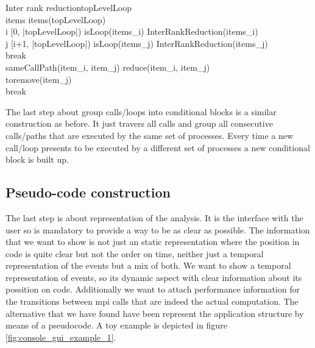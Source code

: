 \begin{pseudocode}{Inter rank reduction}{topLevelLoop}
\label{pc:inter_rank_reduction}
     \\
    items \GETS items(topLevelLoop) \\
    \FOR i \in [0, |topLevelLoop|) \DO
    \BEGIN
      \IF isLoop(items_{i}) \THEN
        InterRankReduction(items_{i}) \\
      \ELSE
      \BEGIN
        \FOR j \in [i+1, |topLevelLoop|) \DO
        \BEGIN
          \IF isLoop(items_{j}) \THEN
          \BEGIN
            InterRankReduction(items_{j}) \\
            break \\
          \END
          \ELSE
          \BEGIN
            \IF sameCallPath(item_{i}, item_{j}) \THEN
            \BEGIN
                reduce(item_{i}, item_{j}) \\
                toremove(item_{j}) \\
            \END
            \ELSE
                break \\
          \END
        \END
      \END
    \END
\end{pseudocode}

The last step about group calls/loops into conditional blocks is a similar
construction as before. It just travers all calls and group all consecutive
calls/paths that are executed by the same set of processes. Every time a new
call/loop presents to be executed by a different set of processes a new
conditional block is built up.

\subsection{Pseudo-code construction}

The last step is about representation of the analysis. It is the interface with
the user so is mandatory to provide a way to be as clear as possible. The
information that we want to show is not just an static representation where the
position in code is quite clear but not the order on time, neither just a
temporal representation of the events but a mix of both. We want to show a
temporal representation of events, so its dynamic aspect with clear information
about its possition on code. Additionally we want to attach performance
information for the transitions between mpi calls that are indeed the actual
computation. The alternative that we have found have been represent the
application structure by means of a pseudocode. A toy example is depicted 
in figure \ref{fig:console_gui_example_1}.

